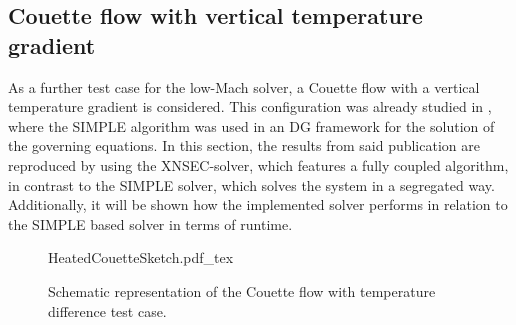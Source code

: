 \subsection{Couette flow with vertical temperature gradient} \label{ssec:CouetteFlowTempDiff}
As a further test case for the low-Mach solver, a Couette flow with a vertical temperature gradient is considered. This configuration was already studied in \textcite{kleinHighorderDiscontinuousGalerkin2016}, where the SIMPLE algorithm was used in an DG framework for the solution of the governing equations. In this section, the results from said publication are reproduced by using the XNSEC-solver, which features a fully coupled algorithm, in contrast to the SIMPLE solver, which solves the system in a segregated way. Additionally, it will be shown how the implemented solver performs in relation to the SIMPLE based solver in terms of runtime.%
\begin{figure}[tb]
	\begin{center}
		\def\svgwidth{0.5\textwidth}
		{HeatedCouetteSketch.pdf_tex}
		\vspace{0.2cm}
		\caption{Schematic representation of the Couette flow with temperature difference test case.}\label{fig:CouetteTempDiff_scheme}
	\end{center}
\end{figure}%
